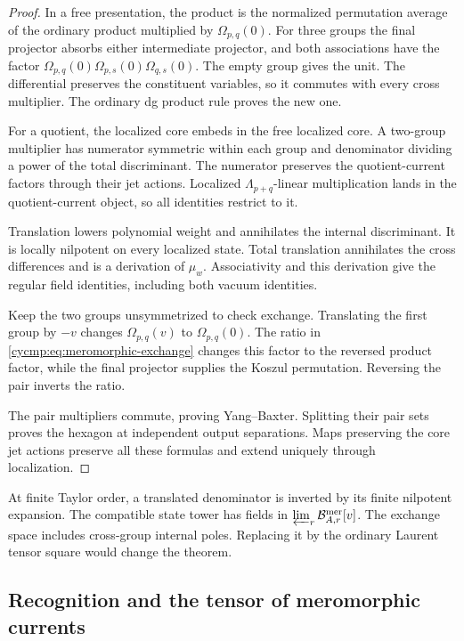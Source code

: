 \begin{proof}
In a free presentation, the product is the normalized permutation
average of the ordinary product multiplied by $\Omega_{p,q}(0)$.
For three groups the final projector absorbs either intermediate
projector, and both associations have the factor
$\Omega_{p,q}(0)\Omega_{p,s}(0)\Omega_{q,s}(0)$.
The empty group gives the unit. The differential preserves the
constituent variables, so it commutes with every cross multiplier.
The ordinary dg product rule proves the new one.

For a quotient, the localized core embeds in the free localized
core. A two-group multiplier has numerator symmetric within each
group and denominator dividing a power of the total discriminant.
The numerator preserves the quotient-current factors through their
jet actions. Localized $\Lambda_{p+q}$-linear multiplication lands
in the quotient-current object, so all identities restrict to it.

Translation lowers polynomial weight and annihilates the internal
discriminant. It is locally nilpotent on every localized state.
Total translation annihilates the cross differences and is a
derivation of $\mu_w$. Associativity and this derivation give the
regular field identities, including both vacuum identities.

Keep the two groups unsymmetrized to check exchange. Translating
the first group by $-v$ changes $\Omega_{p,q}(v)$ to
$\Omega_{p,q}(0)$. The ratio in
\eqref{cycmp:eq:meromorphic-exchange} changes this factor to the
reversed product factor, while the final projector supplies the
Koszul permutation. Reversing the pair inverts the ratio.

The pair multipliers commute, proving Yang--Baxter. Splitting their
pair sets proves the hexagon at independent output separations.
Maps preserving the core jet actions preserve all these formulas
and extend uniquely through localization.
\end{proof}

At finite Taylor order, a translated denominator is inverted by its
finite nilpotent expansion. The compatible state tower has fields
in $\varprojlim_r\mathcal B_{A,r}^{\mathrm{mer}}[v]$.
The exchange space includes cross-group internal poles. Replacing
it by the ordinary Laurent tensor square would change the theorem.

\subsection{Recognition and the tensor of meromorphic currents}

